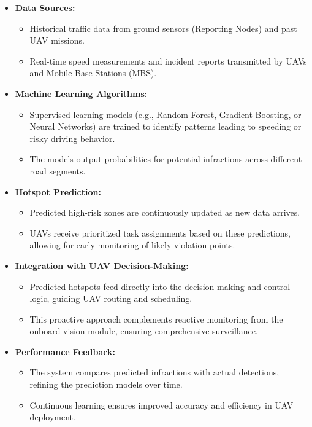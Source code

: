 \begin{itemize}
    \item \textbf{Data Sources:} 
    \begin{itemize}
        \item Historical traffic data from ground sensors (Reporting Nodes) and past UAV missions.
        \item Real-time speed measurements and incident reports transmitted by UAVs and Mobile Base Stations (MBS).
    \end{itemize}

    \item \textbf{Machine Learning Algorithms:} 
    \begin{itemize}
        \item Supervised learning models (e.g., Random Forest, Gradient Boosting, or Neural Networks) are trained to identify patterns leading to speeding or risky driving behavior.
        \item The models output probabilities for potential infractions across different road segments.
    \end{itemize}

    \item \textbf{Hotspot Prediction:} 
    \begin{itemize}
        \item Predicted high-risk zones are continuously updated as new data arrives.
        \item UAVs receive prioritized task assignments based on these predictions, allowing for early monitoring of likely violation points.
    \end{itemize}

    \item \textbf{Integration with UAV Decision-Making:} 
    \begin{itemize}
        \item Predicted hotspots feed directly into the decision-making and control logic, guiding UAV routing and scheduling.
        \item This proactive approach complements reactive monitoring from the onboard vision module, ensuring comprehensive surveillance.
    \end{itemize}

    \item \textbf{Performance Feedback:} 
    \begin{itemize}
        \item The system compares predicted infractions with actual detections, refining the prediction models over time.
        \item Continuous learning ensures improved accuracy and efficiency in UAV deployment.
    \end{itemize}
\end{itemize}

